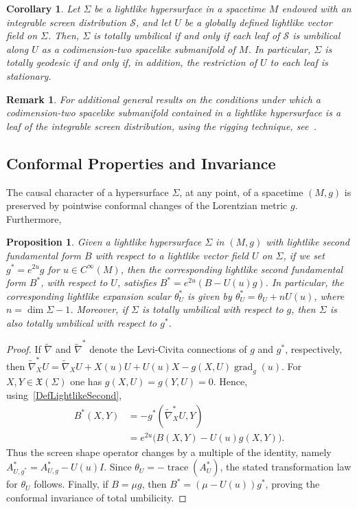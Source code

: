 \documentclass[11pt]{article}
\numberwithin{equation}{section}
\newtheorem{corollary}[theorem]{Corollary}
\newtheorem{proposition}[theorem]{Proposition}
\newtheorem{remark}[theorem]{Remark}
\begin{document}
\begin{corollary}\label{cor:umbilical_leaves}
	Let $\Sigma$ be a lightlike hypersurface in a spacetime $M$ endowed with an integrable screen distribution $\mathcal{S}$, and let $U$ be a globally defined lightlike vector field on $\Sigma$. Then, $\Sigma$ is totally umbilical if and only if each leaf of $\mathcal{S}$ is umbilical along $U$ as a codimension-two spacelike submanifold of $M$. In particular, $\Sigma$ is totally geodesic if and only if, in addition, the restriction of $U$ to each leaf is stationary.
\end{corollary}
	
	\begin{remark}\normalfont
		For additional general results on the conditions under which a codimension-two spacelike submanifold contained in a lightlike hypersurface is a leaf of the integrable screen distribution, using the rigging technique, see~\cite{gutierrez20}. 
	\end{remark}
	
	\subsection{Conformal Properties and Invariance}
	
The causal character of a hypersurface $\Sigma$, at any point, of a spacetime $(M,g)$ is preserved by pointwise conformal changes of the Lorentzian metric $g$. Furthermore,

\begin{proposition}\label{propo:Conformal_Change}
	Given a lightlike hypersurface $\Sigma$ in $(M,g)$ with lightlike second fundamental form $B$ with respect to a lightlike vector field $U$ on $\Sigma$, if we set $g^* = e^{2u}g$ for $u \in C^{\infty}(M)$, then the corresponding lightlike second fundamental form $B^*$, with respect to $U$, satisfies $B^* = e^{2u}(B - U(u)g)$. In particular, the corresponding lightlike expansion scalar $\theta^*_U$ is given by $\theta^*_U = \theta_U + n U(u)$, where $n = \dim\Sigma-1$. Moreover, if $\Sigma$ is totally umbilical with respect to $g$, then $\Sigma$ is also totally umbilical with respect to $g^*$.
\end{proposition}
\begin{proof}
	If $\widetilde{\nabla}$ and $\widetilde{\nabla}^*$ denote the Levi-Civita connections of $g$ and $g^*$, respectively, then
	\(
	\widetilde{\nabla}^*_X U = \widetilde{\nabla}_X U + X(u)U + U(u)X - g(X,U) \operatorname{grad}_g(u).
	\)
	For $X,Y\in\mathfrak X(\Sigma)$ one has $g(X,U)=g(Y,U)=0$. Hence, using~\eqref{DefLightlikeSecond},
	\[
	\begin{aligned}
	B^*(X,Y)
	&=-g^*(\widetilde{\nabla}^*_XU,Y)\\
	&=e^{2u}\bigl(B(X,Y)-U(u)g(X,Y)\bigr).
	\end{aligned}
	\]
	Thus the screen shape operator changes by a multiple of the identity, namely $A^*_{U,g^*}=A^*_{U,g}-U(u)I$. Since $\theta_U=-\operatorname{trace}(A_U^*)$, the stated transformation law for $\theta_U$ follows. Finally, if $B=\mu g$, then $B^*=(\mu-U(u))g^*$, proving the conformal invariance of total umbilicity.
\end{proof}
	
\end{document}
